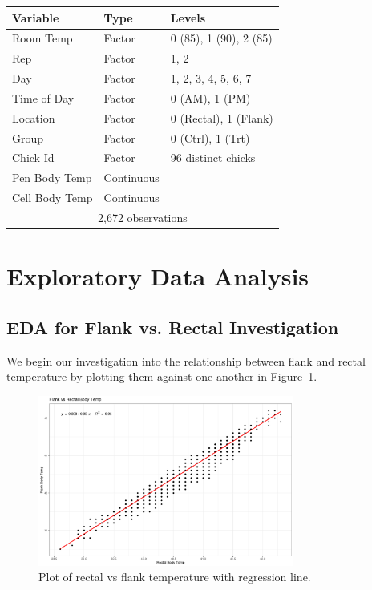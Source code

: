\documentclass[a4paper, 10pt, titlepage]{article}
\begin{document}
\begin{table}[ht]
	\centering
	\begin{tabular}{|l|l|l|}
		\hline
		\textbf{Variable} & \textbf{Type} & \textbf{Levels}\\
		\hline
		Room Temp & Factor & 0 (85), 1 (90), 2 (85)\\
		Rep & Factor & 1, 2\\
		Day & Factor & 1, 2, 3, 4, 5, 6, 7\\
		Time of Day & Factor & 0 (AM), 1 (PM)\\
		Location & Factor & 0 (Rectal), 1 (Flank)\\
		Group & Factor & 0 (Ctrl), 1 (Trt)\\
		Chick Id & Factor & 96 distinct chicks\\
		Pen Body Temp & Continuous & \\
		Cell Body Temp & Continuous & \\
		\hline
		\multicolumn{3}{|c|}{2,672 observations}\\
		\hline
	\end{tabular}
	\label{table:transformed air data}
\end{table}

\section{Exploratory Data Analysis}
\subsection{EDA for Flank vs. Rectal Investigation}
We begin our investigation into the relationship between flank and rectal temperature by plotting them against one another in Figure~\ref{figure:rectal wing plt}.

\begin{figure}[]
	\centering
		\includegraphics[width = 0.75\textwidth]{images/rectal_wing_plt.png}
	\caption{Plot of rectal vs flank temperature with regression line.}
	\label{figure:rectal wing plt}
\end{figure}
\end{document}
